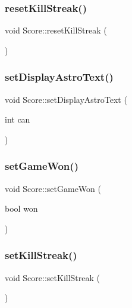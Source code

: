 \subsubsection{\texorpdfstring{reset\+Kill\+Streak()}{resetKillStreak()}}
{\footnotesize\ttfamily void Score\+::reset\+Kill\+Streak (\begin{DoxyParamCaption}{ }\end{DoxyParamCaption})}

\mbox{\label{class_score_a3b9b2184527917932481449f410ab3ed}} 
\subsubsection{\texorpdfstring{set\+Display\+Astro\+Text()}{setDisplayAstroText()}}
{\footnotesize\ttfamily void Score\+::set\+Display\+Astro\+Text (\begin{DoxyParamCaption}\item[{int}]{can }\end{DoxyParamCaption})}

\mbox{\label{class_score_a9d27b67bf0ec19b534a77ea2a2885f3f}} 
\subsubsection{\texorpdfstring{set\+Game\+Won()}{setGameWon()}}
{\footnotesize\ttfamily void Score\+::set\+Game\+Won (\begin{DoxyParamCaption}\item[{bool}]{won }\end{DoxyParamCaption})}

\mbox{\label{class_score_af0065ea2bf0bf3c1dc92140a1f7e371f}} 
\subsubsection{\texorpdfstring{set\+Kill\+Streak()}{setKillStreak()}}
{\footnotesize\ttfamily void Score\+::set\+Kill\+Streak (\begin{DoxyParamCaption}{ }\end{DoxyParamCaption})}

